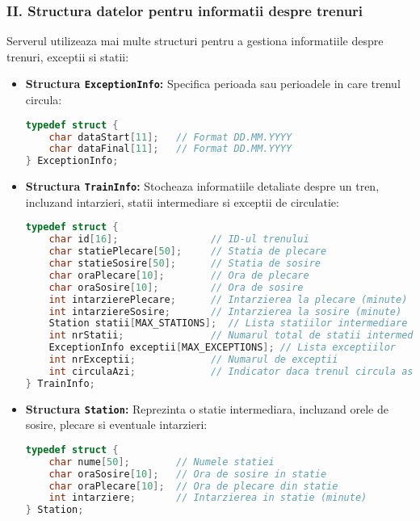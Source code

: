 \documentclass[runningheads]{llncs}
\begin{document}
\subsubsection*{II. Structura datelor pentru informatii despre trenuri}
Serverul utilizeaza mai multe structuri pentru a gestiona informatiile despre trenuri, exceptii si statii:

\begin{itemize}
    \item \textbf{Structura \texttt{ExceptionInfo}:} Specifica perioada sau perioadele in care trenul circula:
    \begin{lstlisting}[language=C, basicstyle=\ttfamily\small]
typedef struct {
    char dataStart[11];   // Format DD.MM.YYYY
    char dataFinal[11];   // Format DD.MM.YYYY
} ExceptionInfo;
    \end{lstlisting}
    \vspace{1cm}
    
    \item \textbf{Structura \texttt{TrainInfo}:} Stocheaza informatiile detaliate despre un tren, incluzand intarzieri, statii intermediare si exceptii de circulatie:
    \begin{lstlisting}[language=C, basicstyle=\ttfamily\small]
typedef struct {
    char id[16];                // ID-ul trenului
    char statiePlecare[50];     // Statia de plecare
    char statieSosire[50];      // Statia de sosire
    char oraPlecare[10];        // Ora de plecare
    char oraSosire[10];         // Ora de sosire
    int intarzierePlecare;      // Intarzierea la plecare (minute)
    int intarziereSosire;       // Intarzierea la sosire (minute)
    Station statii[MAX_STATIONS];  // Lista statiilor intermediare
    int nrStatii;               // Numarul total de statii intermediare
    ExceptionInfo exceptii[MAX_EXCEPTIONS]; // Lista exceptiilor
    int nrExceptii;             // Numarul de exceptii
    int circulaAzi;             // Indicator daca trenul circula astazi (1 = Da, 0 = Nu)
} TrainInfo;
    \end{lstlisting}
    
    \item \textbf{Structura \texttt{Station}:} Reprezinta o statie intermediara, incluzand orele de sosire, plecare si eventuale intarzieri:
    \begin{lstlisting}[language=C, basicstyle=\ttfamily\small]
typedef struct {
    char nume[50];        // Numele statiei
    char oraSosire[10];   // Ora de sosire in statie
    char oraPlecare[10];  // Ora de plecare din statie
    int intarziere;       // Intarzierea in statie (minute)
} Station;
    \end{lstlisting}
\end{itemize}
\end{document}
